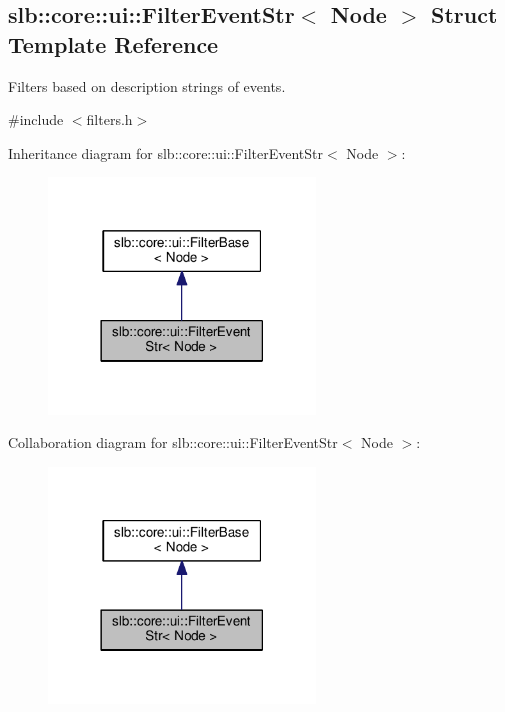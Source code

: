 \hypertarget{structslb_1_1core_1_1ui_1_1FilterEventStr}{}\subsection{slb\+:\+:core\+:\+:ui\+:\+:Filter\+Event\+Str$<$ Node $>$ Struct Template Reference}
\label{structslb_1_1core_1_1ui_1_1FilterEventStr}


Filters based on description strings of events.  




{\ttfamily \#include $<$filters.\+h$>$}



Inheritance diagram for slb\+:\+:core\+:\+:ui\+:\+:Filter\+Event\+Str$<$ Node $>$\+:\nopagebreak
\begin{figure}[H]
\begin{center}
\leavevmode
\includegraphics[width=201pt]{structslb_1_1core_1_1ui_1_1FilterEventStr__inherit__graph}
\end{center}
\end{figure}


Collaboration diagram for slb\+:\+:core\+:\+:ui\+:\+:Filter\+Event\+Str$<$ Node $>$\+:\nopagebreak
\begin{figure}[H]
\begin{center}
\leavevmode
\includegraphics[width=201pt]{structslb_1_1core_1_1ui_1_1FilterEventStr__coll__graph}
\end{center}
\end{figure}
